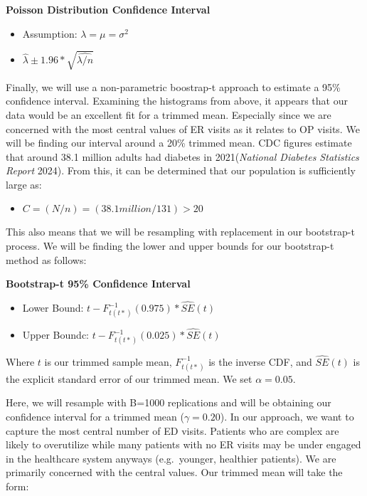 \documentclass[
]{article}
\providecommand{\tightlist}{%
  \setlength{\itemsep}{0pt}\setlength{\parskip}{0pt}}
\begin{document}
\textbf{Poisson Distribution Confidence Interval}

\begin{itemize}
\tightlist
\item
  Assumption: \(\lambda = \mu = \sigma^2\)
\item
  \(\hat{\lambda} \pm 1.96* \sqrt{\hat{\lambda/n}}\)
\end{itemize}

Finally, we will use a non-parametric boostrap-t approach to estimate a
95\% confidence interval. Examining the histograms from above, it
appears that our data would be an excellent fit for a trimmed mean.
Especially since we are concerned with the most central values of ER
visits as it relates to OP visits. We will be finding our interval
around a 20\% trimmed mean. CDC figures estimate that around 38.1
million adults had diabetes in 2021(\emph{National Diabetes Statistics
Report} 2024). From this, it can be determined that our population is
sufficiently large as:

\begin{itemize}
\tightlist
\item
  \(C = (N/n) = (38.1 million / 131) > 20\)
\end{itemize}

This also means that we will be resampling with replacement in our
bootstrap-t process. We will be finding the lower and upper bounds for
our bootstrap-t method as follows:

\textbf{Bootstrap-t 95\% Confidence Interval}

\begin{itemize}
\item
  Lower Bound: \(t - F_{t(t*)}^{-1}(0.975)*\hat{SE}(t)\)
\item
  Upper Boundc: \(t - F_{t(t*)}^{-1}(0.025)*\hat{SE}(t)\)
\end{itemize}

Where \(t\) is our trimmed sample mean, \(F_{t(t*)}^{-1}\) is the
inverse CDF, and \(\hat{SE}(t)\) is the explicit standard error of our
trimmed mean. We set \(\alpha = 0.05\).

Here, we will resample with B=1000 replications and will be obtaining
our confidence interval for a trimmed mean (\(\gamma = 0.20\)). In our
approach, we want to capture the most central number of ED visits.
Patients who are complex are likely to overutilize while many patients
with no ER visits may be under engaged in the healthcare system anyways
(e.g.~younger, healthier patients). We are primarily concerned with the
central values. Our trimmed mean will take the form:
\end{document}
